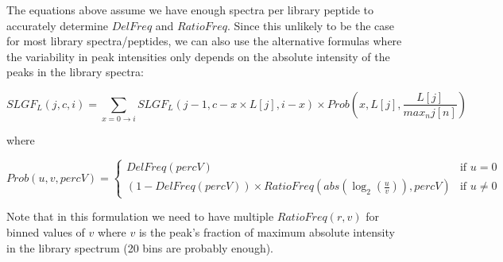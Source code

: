 \documentclass[endnotes,10pt]{article}
\begin{document}
The equations above assume we have enough spectra per library peptide to accurately determine $DelFreq$ and $RatioFreq$. Since this unlikely to be the case for most library spectra/peptides, we can also use the alternative formulas where the variability in peak intensities only depends on the absolute intensity of the peaks in the library spectra:

\begin{equation}
SLGF_L(j,c,i) = \sum_{x=0\rightarrow i}
   SLGF_L( j-1, c-x\times L[j], i-x ) \times Prob( x, L[j], \frac{L[j]}{max_n j[n]} )
\end{equation}

where

\begin{equation}
Prob( u, v , percV) =
        \left\{ \begin{array}{ll}
            DelFreq( percV ) & \mbox{if\ } u = 0\\
            (1-DelFreq(percV))\times RatioFreq( abs( \log_2( \frac{ u }{ v } ) ) , percV ) & \mbox{if\ } u\neq 0
        \end{array}
        \right.
\end{equation}

Note that in this formulation we need to have multiple $RatioFreq(r,v)$ for binned values of $v$ where $v$ is the peak's fraction of maximum absolute intensity in the library spectrum (20 bins are probably enough).
\end{document}
